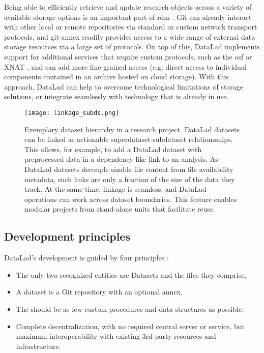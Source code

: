{Being able to efficiently retrieve and update research objects across a variety of available storage options is an important part of \gls{rdm} \citep{borghi2018data}.
Git can already interact with other local or remote repositories via standard or custom network transport protocols, and git-annex readily provides access to a wide range of external data storage resources via a large set of protocols.
On top of this, DataLad implements support for additional services that require custom protocols, such as the \gls{osf} \citep{hanke2021dlosf} or XNAT \citep[\url{www.xnat.org},][]{halchenko2021xnat}, and can add more fine-grained access (e.g. direct access to individual components contained in an archive hosted on cloud storage).
With this approach, DataLad can help to overcome technological limitations of storage solutions, or integrate seamlessly with technology that is already in use.

\begin{figure}
	\centering
	\texttt{[image: linkage\_subds.png]}
	\caption[DataLad dataset linkage]{Exemplary dataset hierarchy in a research project. DataLad datasets can be linked as actionable superdataset-subdataset relationsships. This allows, for example, to add a DataLad dataset with preprocessed data in a dependency-like link to an analysis. As DataLad datasets decouple sizable file content from file availability metadata, such links are only a fraction of the size of the data they track. At the same time, linkage is seamless, and DataLad operations can work across dataset boundaries. This feature enables modular projects from stand-alone units that facilitate reuse.}
	\label{fig:subdslinkage}
\end{figure}

\subsection{Development principles}

DataLad's development is guided by four principles \citep{Halchenko2021}:
\begin{itemize}
	\item The only two recognized entities are Datasets and the files they comprise,
	\item A dataset is a Git repository with an optional annex,
	\item The should be as few custom procedures and data structures as possible,
	\item Complete decentralization, with no required central server or service, but maximum interoperability with existing 3rd-party resources and infrastructure.
\end{itemize}

}
